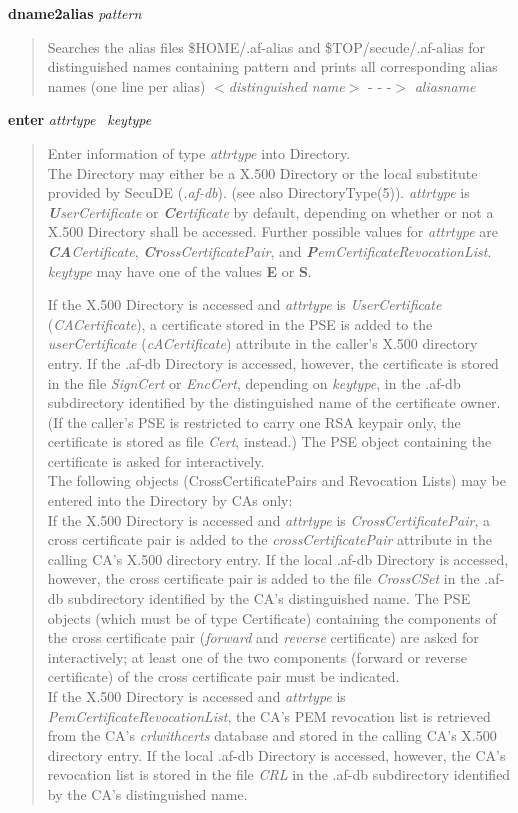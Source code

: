 {\bf dname2alias} {\em pattern}
\begin{quote}
Searches the alias files \$HOME/.af-alias and \$TOP/secude/.af-alias for distinguished names
containing pattern and prints all corresponding alias names (one line per alias)
\bc
$<${\em distinguished name}$>$ - - -$>$  {\em aliasname}
\ec
\end{quote}

{\bf enter} {\em attrtype}~ {\em keytype} 
\begin{quote}
Enter information of type {\em attrtype} into Directory. \\
The Directory may either be a X.500 Directory or the local substitute provided by 
SecuDE ({\em .af-db}). (see also DirectoryType(5)).
{\em attrtype} is {\em {\bf U}serCertificate} or {\em {\bf Ce}rtificate} by default, depending on whether
or not a X.500 Directory shall be accessed. Further possible values for {\em attrtype} are
{\em {\bf CA}Certificate}, {\em {\bf Cr}ossCertificatePair}, and {\em {\bf P}emCertificateRevocationList}.
{\em keytype} may have one of the values {\bf E} or {\bf S}.
 
If the X.500 Directory is accessed and {\em attrtype} is {\em UserCertificate} ({\em CACertificate}), a certificate stored in the PSE 
is added to the {\em userCertificate} ({\em cACertificate}) attribute in
the caller's X.500 directory entry.
If the .af-db Directory is accessed, however, the certificate is stored in the file {\em SignCert} or 
{\em EncCert}, depending on {\em keytype}, in the .af-db subdirectory identified by the distinguished name 
of the certificate owner. (If the caller's PSE is restricted to carry one RSA keypair only, the
certificate is stored as file {\em Cert}, instead.)
The PSE object containing the certificate is asked for interactively. \\
The following objects (CrossCertificatePairs and Revocation Lists) may be entered into 
the Directory by CAs only: \\
If the X.500 Directory is accessed and {\em attrtype} is {\em CrossCertificatePair}, 
a cross certificate pair 
is added to the {\em crossCertificatePair} attribute in the calling CA's X.500 directory entry. 
If the local .af-db Directory is accessed, however, the cross certificate pair is added to the 
file {\em CrossCSet}
in the .af-db subdirectory identified by the CA's distinguished name.
The PSE objects (which must be of type 
Certificate) containing the components of the cross certificate pair ({\em forward} and {\em reverse}
certificate) are asked for interactively; at least one of the two components (forward 
or reverse certificate) of the cross certificate pair must be indicated. \\
If the X.500 Directory is accessed and {\em attrtype} is {\em PemCertificateRevocationList}, 
the CA's PEM revocation list
is retrieved from the CA's {\em crlwithcerts} database and stored in the calling CA's X.500 
directory entry.
If the local .af-db Directory is accessed, however, the CA's revocation list is stored in
the file {\em CRL} in the .af-db subdirectory identified by the CA's distinguished name. 
\end{quote}

